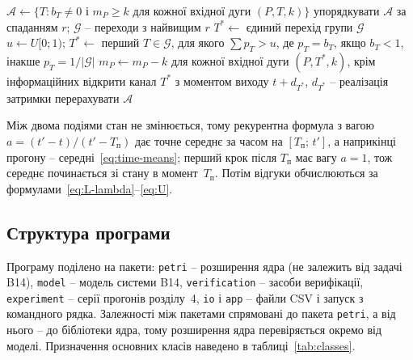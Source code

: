 \begin{algorithm}[tp]
  \caption{Вхід маркерів у переходи з вирішенням конфліктів}\label{alg:input}
  \begin{algorithmic}[1]
      \State $\mathcal{A} \gets \{T : b_T \neq 0 \text{ і } m_P \ge k \text{ для кожної вхідної дуги } (P, T, k)\}$
        \State упорядкувати $\mathcal{A}$ за спаданням $r$; $\mathcal{G}$ -- переходи з найвищим $r$
          \State $T^* \gets$ єдиний перехід групи $\mathcal{G}$
        \Else
          \State $u \gets U[0;1)$; $T^* \gets$ перший $T \in \mathcal{G}$, для якого
            $\sum p_T > u$, де $p_T = b_T$, якщо $b_T < 1$, інакше $p_T = 1/|\mathcal{G}|$
        \EndIf
        \State $m_P \gets m_P - k$ для кожної вхідної дуги $(P, T^*, k)$, крім інформаційних
        \State відкрити канал $T^*$ з моментом виходу $t + d_{T^*}$, $d_{T^*}$ -- реалізація затримки
        \State перерахувати $\mathcal{A}$
      \EndWhile
    \EndProcedure
  \end{algorithmic}
\end{algorithm}

Між двома подіями стан не змінюється, тому рекурентна формула з вагою $a=(t'-t)/(t'-T_{\text{п}})$
дає точне середнє за часом на $[T_{\text{п}};\,t']$, а наприкінці прогону -- середні~\eqref{eq:time-means};
перший крок після $T_{\text{п}}$ має вагу $a=1$, тож середнє починається зі стану в момент~$T_{\text{п}}$. Потім
відгуки обчислюються за формулами~\eqref{eq:L-lambda}--\eqref{eq:U}.

\subsection{Структура програми}\label{sec:structure}

Програму поділено на пакети: \texttt{petri} -- розширення ядра (не залежить від задачі B14),
\texttt{model} -- модель системи B14, \texttt{verification} -- засоби верифікації,
\texttt{experiment} -- серії прогонів розділу~4, \texttt{io} і \texttt{app} -- файли CSV і запуск з
командного рядка. Залежності між пакетами спрямовані до пакета \texttt{petri}, а від нього -- до
бібліотеки ядра, тому розширення ядра перевіряється окремо від моделі. Призначення основних класів
наведено в таблиці~\ref{tab:classes}.

